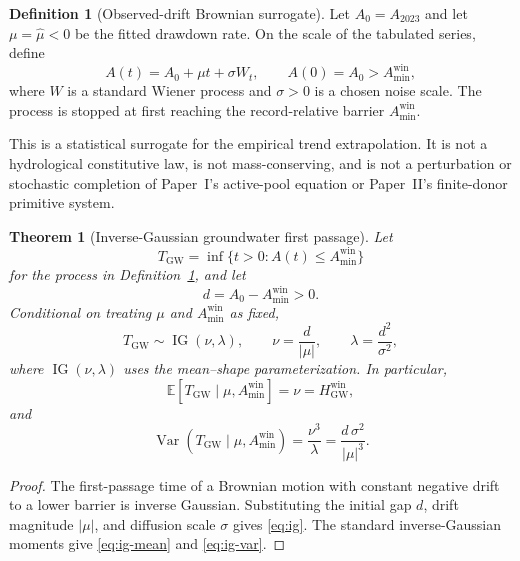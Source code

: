 \documentclass[11pt]{article}
\newtheorem{theorem}{Theorem}
\theoremstyle{definition}
\newtheorem{definition}{Definition}
\begin{document}
\begin{definition}[Observed-drift Brownian surrogate]
\label{def:bm}
Let $A_0=A_{2023}$ and let $\mu=\widehat\mu<0$ be the fitted drawdown rate. On the scale of the tabulated series, define
\begin{equation}
A(t)=A_0+\mu t+\sigma W_t,
\qquad A(0)=A_0>A_{\min}^{\mathrm{win}},
\label{eq:bm}
\end{equation}
where $W$ is a standard Wiener process and $\sigma>0$ is a chosen noise scale. The process is stopped at first reaching the record-relative barrier $A_{\min}^{\mathrm{win}}$.
\end{definition}

This is a statistical surrogate for the empirical trend extrapolation. It is not a hydrological constitutive law, is not mass-conserving, and is not a perturbation or stochastic completion of Paper~I's active-pool equation or Paper~II's finite-donor primitive system.

\begin{theorem}[Inverse-Gaussian groundwater first passage]
\label{thm:ig}
Let
\[
T_{\mathrm{GW}}=\inf\{t>0:A(t)\le A_{\min}^{\mathrm{win}}\}
\]
for the process in Definition~\ref{def:bm}, and let
\[
d=A_0-A_{\min}^{\mathrm{win}}>0.
\]
Conditional on treating $\mu$ and $A_{\min}^{\mathrm{win}}$ as fixed,
\begin{equation}
T_{\mathrm{GW}}\sim\operatorname{IG}(\nu,\lambda),
\qquad
\nu=\frac{d}{|\mu|},
\qquad
\lambda=\frac{d^2}{\sigma^2},
\label{eq:ig}
\end{equation}
where $\operatorname{IG}(\nu,\lambda)$ uses the mean--shape parameterization. In particular,
\begin{equation}
\mathbb E[T_{\mathrm{GW}}\mid\mu,A_{\min}^{\mathrm{win}}]
=\nu=H_{\mathrm{GW}}^{\mathrm{win}},
\label{eq:ig-mean}
\end{equation}
and
\begin{equation}
\operatorname{Var}(T_{\mathrm{GW}}\mid\mu,A_{\min}^{\mathrm{win}})
=\frac{\nu^3}{\lambda}
=\frac{d\,\sigma^2}{|\mu|^3}.
\label{eq:ig-var}
\end{equation}
\end{theorem}

\begin{proof}
The first-passage time of a Brownian motion with constant negative drift to a lower barrier is inverse Gaussian. Substituting the initial gap $d$, drift magnitude $|\mu|$, and diffusion scale $\sigma$ gives \eqref{eq:ig}. The standard inverse-Gaussian moments give \eqref{eq:ig-mean} and \eqref{eq:ig-var}.\end{proof}
\end{document}

